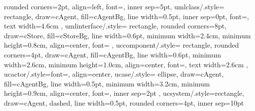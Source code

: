 {{    rounded corners=2pt, align=left, font=\footnotesize, inner sep=5pt},
  umlclass/.style={
    rectangle, draw=cAgent, fill=cAgentBg, line width=0.5pt,
    inner sep=0pt, font=\small, text width=4.6cm
  },
  umlinterface/.style={
    rectangle, rounded corners=8pt, draw=cStore, fill=cStoreBg,
    line width=0.6pt, minimum width=2.4cm, minimum height=0.8cm,
    align=center, font=\small
  },
  uccomponent/.style={
    rectangle, rounded corners=4pt, draw=cAgent, fill=cAgentBg,
    line width=0.6pt, minimum width=2.6cm, minimum height=1.0cm,
    align=center, font=\small, text width=2.6cm
  },
  ucactor/.style={font=\small, align=center},
  ucase/.style={
    ellipse, draw=cAgent, fill=cAgentBg, line width=0.5pt,
    minimum width=3.2cm, minimum height=0.9cm,
    align=center, font=\footnotesize, inner sep=2pt
  },
  ucsystem/.style={rectangle, draw=cAgent, dashed, line width=0.5pt,
    rounded corners=4pt, inner sep=10pt}
}

\newcommand{\ucactorperson}[1]{%
  \begin{tikzpicture}[baseline=(label.base)]
    \draw[cAgent, line width=0.6pt] (0,0) circle (0.18);
    \draw[cAgent, line width=0.6pt] (0,-0.18) -- (0,-0.85);
    \draw[cAgent, line width=0.6pt] (-0.35,-0.45) -- (0.35,-0.45);
    \draw[cAgent, line width=0.6pt] (0,-0.85) -- (-0.30,-1.30);
    \draw[cAgent, line width=0.6pt] (0,-0.85) -- (0.30,-1.30);
    \node[font=\footnotesize, below=0pt] (label) at (0,-1.40) {#1};
  \end{tikzpicture}}
